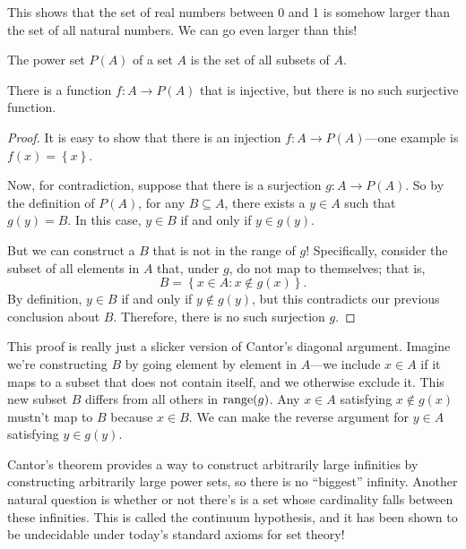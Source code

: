 \documentclass[../m131main.tex]{subfiles}
\begin{document}
This shows that the set of real numbers between 0 and 1 is somehow larger than the set of all natural numbers.
We can go even larger than this!

\begin{definition}
    The power set $P(A)$ of a set $A$ is the set of all subsets of $A$.
\end{definition}

\begin{theorem}
    There is a function $f : A \to P(A)$ that is injective, but there is no such surjective function.
\end{theorem}

\begin{proof}
    It is easy to show that there is an injection $f: A \to P(A)$---one example is $f(x) = \left\{ x \right\}$.

    Now, for contradiction, suppose that there is a surjection $g : A \to P(A)$.
    So by the definition of $P(A)$, for any $B \subseteq A$, there exists a $y \in A$ such that $g(y) = B$.
    In this case, $y \in B$ if and only if $y \in g(y)$.

    But we can construct a $B$ that is not in the range of $g$!
    Specifically, consider the subset of all elements in $A$ that, under $g$, do not map to themselves; that is,
    \[ B = \left\{ x \in A : x \not\in g(x) \right\}. \]
    By definition, $y \in B$ if and only if $y \not\in g(y)$, but this contradicts our previous conclusion about $B$.
    Therefore, there is no such surjection $g$.
\end{proof}

This proof is really just a slicker version of Cantor's diagonal argument.
Imagine we're constructing $B$ by going element by element in $A$---we include $x \in A$ if it maps to a subset that does not contain itself, and we otherwise exclude it.
This new subset $B$ differs from all others in $\textrm{range}(g)$.
Any $x \in A$ satisfying $x \not\in g(x)$ mustn't map to $B$ because $x \in B$.
We can make the reverse argument for $y \in A$ satisfying $y \in g(y)$.

Cantor's theorem provides a way to construct arbitrarily large infinities by constructing arbitrarily large power sets, so there is no ``biggest'' infinity.
Another natural question is whether or not there's is a set whose cardinality falls between these infinities.
This is called the continuum hypothesis, and it has been shown to be undecidable under today's standard axioms for set theory!
\end{document}
